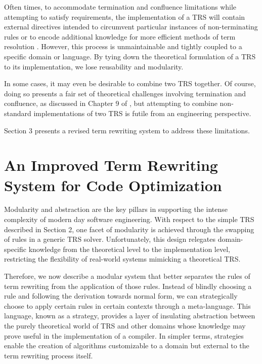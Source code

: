 \documentclass{article}
\begin{document}
Often times, to accommodate termination and confluence limitations while attempting to satisfy requirements,
the implementation of a TRS will contain external directives intended to circumvent particular instances of non-terminating rules
or to encode additional knowledge for more efficient methods of term resolution \cite{spoofax}.
However, this process is unmaintainable and tightly coupled to a specific domain or language.
By tying down the theoretical formulation of a TRS to its implementation, we lose reusability and modularity.

In some cases, it may even be desirable to combine two TRS together. Of course, doing so presents a fair set of theoretical challenges
involving termination and confluence,
as discussed in Chapter 9 of \cite{baader1998term}, but attempting to combine non-standard implementations of two TRS is futile from an engineering perspective.

Section 3 presents a revised term rewriting system to address these limitations.

\section{An Improved Term Rewriting System for Code Optimization}


Modularity and abstraction are the key pillars in supporting the intense complexity of modern day software engineering.
With respect to the simple TRS described in Section 2, one facet of modularity is achieved through the swapping of rules in a generic TRS solver.
Unfortunately, this design relegates domain-specific knowledge from the theoretical level to the implementation level,
restricting the flexibility of real-world systems mimicking a theoretical TRS.

Therefore, we now describe a modular system that better separates the rules of term rewriting from the application of those rules.
Instead of blindly choosing a rule and following the derivation towards normal form, we can strategically choose to apply
certain rules in certain contexts through a meta-language. This language, known as a strategy, provides a layer of insulating abstraction
between the purely theoretical world of TRS and other domains whose knowledge may prove useful in the implementation of a compiler.
In simpler terms, strategies enable the creation of algorithms customizable to a domain but external to the term rewriting process itself.
\end{document}
